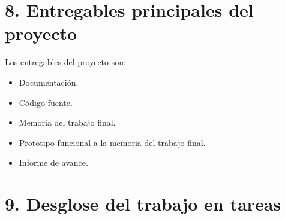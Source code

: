 \documentclass[
    11pt, %
]{charter}
\begin{document}
    \section{8. Entregables principales del proyecto}
    \label{sec:entregables}

    Los entregables del proyecto son:

    \begin{itemize}
    \item Documentación.
    \item Código fuente.
    \item Memoria del trabajo final.
    \item Prototipo funcional a la memoria del trabajo final.
    \item Informe de avance.
    \end{itemize}

    \section{9. Desglose del trabajo en tareas}
    \label{sec:wbs}
\end{document}
